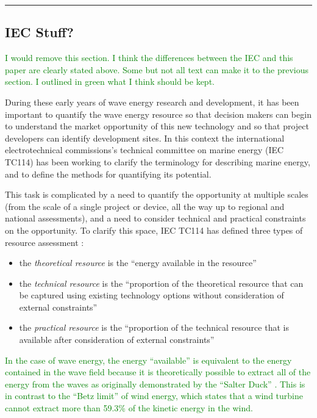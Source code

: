 \noindent\rule{12cm}{0.4pt}


\subsection{IEC Stuff?}
\textcolor{green}{I would remove this section. I think the differences between the IEC and this paper are clearly stated above. Some but not all text can make it to the previous section. I outlined in green what I think should be kept.}

During these early years of wave energy research and development, it has been
important to quantify the wave energy resource so that decision makers can begin
to understand the market opportunity of this new technology and so that project developers can identify development sites. In this context the international electrotechnical commissions's technical committee on marine energy (IEC TC114) has been working to clarify the terminology for describing marine energy, and to define the methods for quantifying its potential.

This task is complicated by a need to quantify the opportunity at multiple scales (from the scale of a single project or device, all the way up to regional and national assessments), and a need to consider technical and practical constraints on the opportunity. To clarify this space, IEC TC114 has defined three types of resource assessment
\citep{internationalelectrotechnicalcommissionPartTerminology2011} :

\begin{itemize}
  \item the {\it theoretical resource} is the ``energy available in the resource''
  \item the {\it technical resource} is the ``proportion of the theoretical resource that can be captured using existing technology options without consideration of external constraints''
  \item the {\it practical resource} is the ``proportion of the technical resource that is available after consideration of external constraints''
  \end{itemize}

\textcolor{green}{
In the case of wave energy, the energy ``available'' is equivalent to the energy contained in the wave field because it is theoretically possible to extract all of the energy from the waves as originally demonstrated by the ``Salter Duck'' \citep{salterRecentProgressDucks1980}. This is in contrast to the ``Betz limit'' of wind energy, which states that a wind turbine cannot extract more than 59.3\% of the kinetic energy in the wind.} 

